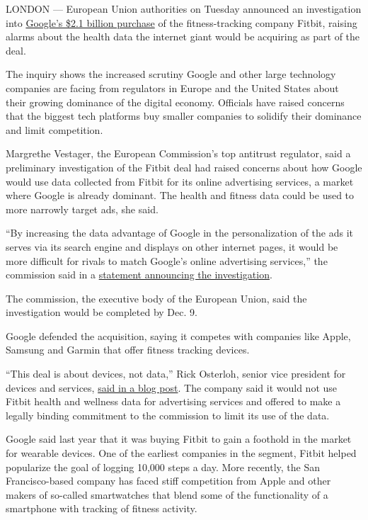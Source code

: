 LONDON --- European Union authorities on Tuesday announced an
investigation into
\href{https://www.nytimes3xbfgragh.onion/2019/11/01/technology/google-fitbit.html}{Google's
\$2.1 billion purchase} of the fitness-tracking company Fitbit, raising
alarms about the health data the internet giant would be acquiring as
part of the deal.

The inquiry shows the increased scrutiny Google and other large
technology companies are facing from regulators in Europe and the United
States about their growing dominance of the digital economy. Officials
have raised concerns that the biggest tech platforms buy smaller
companies to solidify their dominance and limit competition.

Margrethe Vestager, the European Commission's top antitrust regulator,
said a preliminary investigation of the Fitbit deal had raised concerns
about how Google would use data collected from Fitbit for its online
advertising services, a market where Google is already dominant. The
health and fitness data could be used to more narrowly target ads, she
said.

``By increasing the data advantage of Google in the personalization of
the ads it serves via its search engine and displays on other internet
pages, it would be more difficult for rivals to match Google's online
advertising services,'' the commission said in a
\href{https://ec.europa.eu/commission/presscorner/detail/en/ip_20_1446}{statement
announcing the investigation}.

The commission, the executive body of the European Union, said the
investigation would be completed by Dec. 9.

Google defended the acquisition, saying it competes with companies like
Apple, Samsung and Garmin that offer fitness tracking devices.

``This deal is about devices, not data,'' Rick Osterloh, senior vice
president for devices and services,
\href{https://blog.google/around-the-globe/google-europe/update-fitbit/}{said
in a blog post}. The company said it would not use Fitbit health and
wellness data for advertising services and offered to make a legally
binding commitment to the commission to limit its use of the data.

Google said last year that it was buying Fitbit to gain a foothold in
the market for wearable devices. One of the earliest companies in the
segment, Fitbit helped popularize the goal of logging 10,000 steps a
day. More recently, the San Francisco-based company has faced stiff
competition from Apple and other makers of so-called smartwatches that
blend some of the functionality of a smartphone with tracking of fitness
activity.


